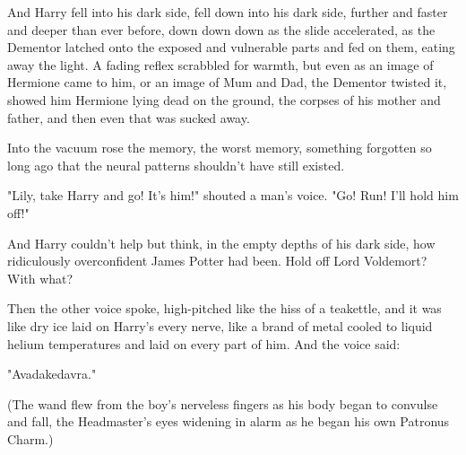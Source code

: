 And Harry fell into his dark side, fell down into his dark side, further and 
faster and deeper than ever before, down down down as the slide accelerated, as 
the Dementor latched onto the exposed and vulnerable parts and fed on them, 
eating away the light. A fading reflex scrabbled for warmth, but even as an 
image of Hermione came to him, or an image of Mum and Dad, the Dementor twisted 
it, showed him Hermione lying dead on the ground, the corpses of his mother and 
father, and then even that was sucked away.

Into the vacuum rose the memory, the worst memory, something forgotten so long 
ago that the neural patterns shouldn't have still existed.

\begin{em}
"Lily, take Harry and go! It's him!" shouted a man's voice. "Go! Run! 
I'll hold him off!"

And Harry couldn't help but think, in the empty depths of his dark side, 
how ridiculously overconfident James Potter had been. Hold off Lord Voldemort? 
With what?

Then the other voice spoke, high-pitched like the hiss of a teakettle, 
and it was like dry ice laid on Harry's every nerve, like a brand of metal 
cooled to liquid helium temperatures and laid on every part of him. And the 
voice said:

"Avadakedavra."
\end{em}

(The wand flew from the boy's nerveless fingers as his body began to convulse 
and fall, the Headmaster's eyes widening in alarm as he began his own Patronus 
Charm.)

